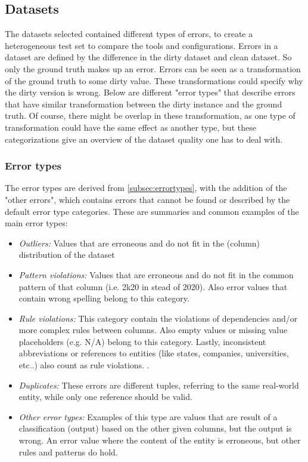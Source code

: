 \subsection{Datasets}
\label{subsec:datasets}
The datasets selected contained different types of errors, to create a heterogeneous test set to compare the tools and configurations. Errors in a dataset are defined by the difference in the dirty dataset and clean dataset. So only the ground truth makes up an error. Errors can be seen as a transformation of the ground truth to some dirty value. These transformations could specify why the dirty version is wrong. Below are different "error types" that describe errors that have similar transformation between the dirty instance and the ground truth. Of course, there might be overlap in these transformation, as one type of transformation could have the same effect as another type, but these categorizations give an overview of the dataset quality one has to deal with.

\subsubsection{Error types}
The error types are derived from \autoref{subsec:errortypes}, with the addition of the "other errors", which contains errors that cannot be found or described by the default error type categories. These are summaries and common examples of the main error types:

\begin{itemize}
    \item \textit{Outliers:} Values that are erroneous and do not fit in the (column) distribution of the dataset
    \item \textit{Pattern violations:} Values that are erroneous and do not fit in the common pattern of that column (i.e. 2k20 in stead of 2020). Also error values that contain wrong spelling belong to this category.
    \item \textit{Rule violations:} This category contain the violations of dependencies and/or more complex rules between columns. Also empty values or missing value placeholders (e.g. N/A) belong to this category. Lastly, inconsistent abbreviations or references to entities (like states, companies, universities, etc..) also count as rule violations.
    .\item \textit{Duplicates:} These errors are different tuples, referring to the same real-world entity, while only one reference should be valid.
    \item \textit{Other error types:} Examples of this type are values that are result of a classification (output) based on the other given columns, but the output is wrong. An error value where the content of the entity is erroneous, but other rules and patterns do hold. 
\end{itemize}


